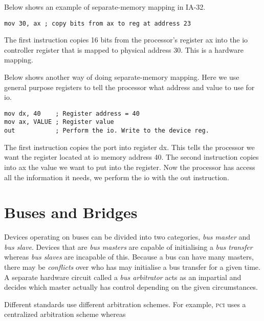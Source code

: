 \frmrule

\begin{example}
Below shows an example of separate-memory mapping in IA-32.

\begin{lstlisting}
mov 30, ax ; copy bits from ax to reg at address 23
\end{lstlisting}
The first instruction copies 16 bits from the processor's register ax
into the io controller register that is mapped to physical address 30. 
This is a hardware mapping.
\end{example}

\frmrule

\begin{example}
Below shows another way of doing separate-memory mapping.
Here we use general purpose registers to tell the processor 
what address and value to use for io.
\begin{lstlisting}
mov dx, 40    ; Register address = 40
mov ax, VALUE ; Register value
out           ; Perform the io. Write to the device reg.
\end{lstlisting}
The first instruction copies the port into register dx. 
This tells the processor we want the register located at 
io memory address 40. The second instruction copies 
into ax the value we want to put into the register.
Now the processor has access all the information it needs, 
we perform the io with the out instruction. 
\end{example}


\section{Buses and Bridges}


Devices operating on buses can be divided into two categories, \textit{bus master} and \textit{bus slave}. 
Devices that are \textit{bus masters} are capable of initialising a \textit{bus transfer}
whereas \textit{bus slaves} are incapable of this. Because a bus can have many masters, there may 
be \textit{conflicts} over who has may initialise a bus transfer for a given time. 
A separate hardware circuit called a \textit{bus arbitrator} acts as an impartial 
and decides which master actually has control depending on the given circumstances. 

Different standards use different arbitration schemes. 
For example, \textsc{pci} uses a centralized arbitration scheme whereas 


\frmrule

